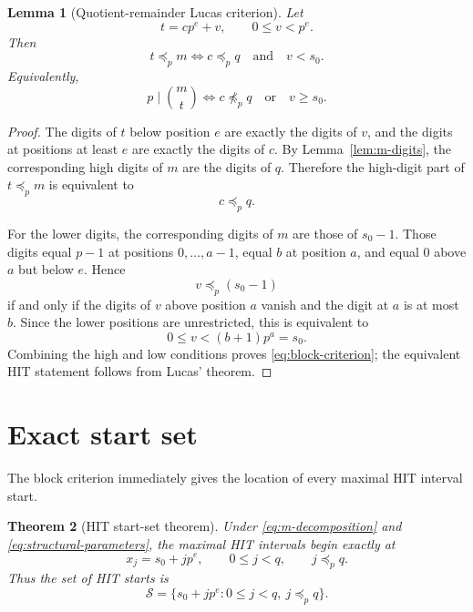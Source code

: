 \documentclass[11pt,a4paper]{article}
\newtheorem{theorem}{Theorem}[section]
\newtheorem{lemma}[theorem]{Lemma}
\theoremstyle{definition}
\theoremstyle{remark}
\begin{document}
\begin{lemma}[Quotient-remainder Lucas criterion]
\label{lem:block-criterion}
Let
\[
t=cp^e+v,
\qquad
0\le v<p^e.
\]
Then
\begin{equation}
\boxed{
 t\preceq_p m
 \iff
 c\preceq_p q\quad\text{and}\quad v<s_0.
}
\label{eq:block-criterion}
\end{equation}
Equivalently,
\begin{equation}
\boxed{
 p\mid\binom mt
 \iff
 c\not\preceq_p q
 \quad\text{or}\quad v\ge s_0.
}
\label{eq:block-hit-criterion}
\end{equation}
\end{lemma}

\begin{proof}
The digits of $t$ below position $e$ are exactly the digits of $v$, and the digits at positions at least $e$ are exactly the digits of $c$.  By Lemma~\ref{lem:m-digits}, the corresponding high digits of $m$ are the digits of $q$.  Therefore the high-digit part of $t\preceq_p m$ is equivalent to
\[
c\preceq_p q.
\]

For the lower digits, the corresponding digits of $m$ are those of $s_0-1$.  Those digits equal $p-1$ at positions $0,\ldots,a-1$, equal $b$ at position $a$, and equal $0$ above $a$ but below $e$.  Hence
\[
v\preceq_p(s_0-1)
\]
if and only if the digits of $v$ above position $a$ vanish and the digit at $a$ is at most $b$.  Since the lower positions are unrestricted, this is equivalent to
\[
0\le v<(b+1)p^a=s_0.
\]
Combining the high and low conditions proves \eqref{eq:block-criterion}; the equivalent HIT statement follows from Lucas' theorem.
\end{proof}

\section{Exact start set}

The block criterion immediately gives the location of every maximal HIT interval start.

\begin{theorem}[HIT start-set theorem]
\label{thm:start-set}
Under \eqref{eq:m-decomposition} and \eqref{eq:structural-parameters}, the maximal HIT intervals begin exactly at
\begin{equation}
\boxed{
 x_j=s_0+jp^e,
 \qquad
 0\le j<q,
 \qquad
 j\preceq_p q.
}
\label{eq:proved-start-set}
\end{equation}
Thus the set of HIT starts is
\[
\mathcal S
=
\{s_0+jp^e:0\le j<q,\ j\preceq_p q\}.
\]
\end{theorem}
\end{document}
